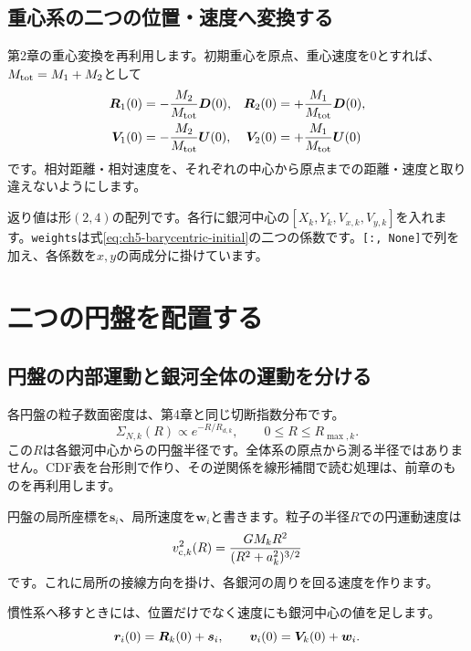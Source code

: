 \subsection{重心系の二つの位置・速度へ変換する}
第2章の重心変換を再利用します。初期重心を原点、重心速度を0とすれば、$M_{\rm tot}=M_1+M_2$として
\begin{align}
\boldsymbol R_1(0)&=-\frac{M_2}{M_{\rm tot}}\boldsymbol D(0),&
\boldsymbol R_2(0)&=+\frac{M_1}{M_{\rm tot}}\boldsymbol D(0),\notag\\
\boldsymbol V_1(0)&=-\frac{M_2}{M_{\rm tot}}\boldsymbol U(0),&
\boldsymbol V_2(0)&=+\frac{M_1}{M_{\rm tot}}\boldsymbol U(0)
\label{eq:ch5-barycentric-initial}
\end{align}
です。相対距離・相対速度を、それぞれの中心から原点までの距離・速度と取り違えないようにします。

返り値は形$(2,4)$の配列です。各行に銀河中心の$[X_k,Y_k,V_{x,k},V_{y,k}]$を入れます。\texttt{weights}は式\eqref{eq:ch5-barycentric-initial}の二つの係数です。\texttt{[:, None]}で列を加え、各係数を$x,y$の両成分に掛けています。

\section{二つの円盤を配置する}
\label{sec:ch5-disk-initial}
\subsection{円盤の内部運動と銀河全体の運動を分ける}
各円盤の粒子数面密度は、第4章と同じ切断指数分布です。
\begin{equation}
\Sigma_{N,k}(R)\propto e^{-R/R_{d,k}},\qquad 0\le R\le R_{\max,k}.
\label{eq:ch5-disk-profile}
\end{equation}
この$R$は各銀河中心からの円盤半径です。全体系の原点から測る半径ではありません。CDF表を台形則で作り、その逆関係を線形補間で読む処理は、前章のものを再利用します。

円盤の局所座標を$\boldsymbol s_i$、局所速度を$\boldsymbol w_i$と書きます。粒子の半径$R$での円運動速度は
\begin{equation}
v_{{\rm c},k}^2(R)=\frac{GM_kR^2}{(R^2+a_k^2)^{3/2}}
\label{eq:ch5-circular-speed}
\end{equation}
です。これに局所の接線方向を掛け、各銀河の周りを回る速度を作ります。

慣性系へ移すときには、位置だけでなく速度にも銀河中心の値を足します。
\begin{equation}
\boldsymbol r_i(0)=\boldsymbol R_k(0)+\boldsymbol s_i,\qquad
\boldsymbol v_i(0)=\boldsymbol V_k(0)+\boldsymbol w_i.
\label{eq:ch5-place-disk}
\end{equation}

